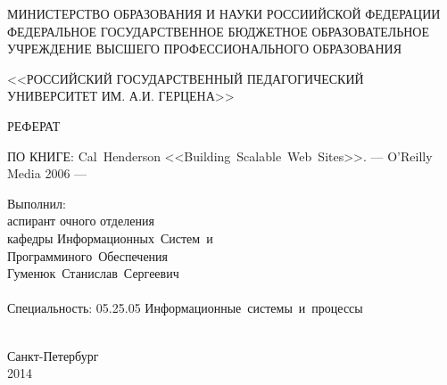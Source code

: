 \thispagestyle{empty}

\begin{center}
МИНИСТЕРСТВО ОБРАЗОВАНИЯ И НАУКИ РОССИИЙСКОЙ ФЕДЕРАЦИИ\\
ФЕДЕРАЛЬНОЕ ГОСУДАРСТВЕННОЕ БЮДЖЕТНОЕ ОБРАЗОВАТЕЛЬНОЕ\\
УЧРЕЖДЕНИЕ ВЫСШЕГО ПРОФЕССИОНАЛЬНОГО ОБРАЗОВАНИЯ\par 

<<РОССИЙСКИЙ ГОСУДАРСТВЕННЫЙ ПЕДАГОГИЧЕСКИЙ\\
УНИВЕРСИТЕТ ИМ. А.И. ГЕРЦЕНА>>
\par
\end{center}



\vspace{50mm}

\begin{center}
РЕФЕРАТ 

ПО КНИГЕ: Cal~Henderson <<Building~Scalable~{Web}~Sites>>. --- O'Reilly Media 2006 ---



\end{center}

\vspace{20mm}
\begin{flushright}
\begin{minipage}
{0.4\textwidth} 
Выполнил:\\
аспирант очного отделения\\
кафедры Информационных~Систем~и\\Программиного~Обеспечения\\
Гуменюк~Станислав~Сергеевич\\ 
\\
Специальность: 05.25.05 Информационные~системы~и~процессы\\
\\[0.3cm] 
\end{minipage}

\end{flushright}

\vfill
\begin{center}
{Санкт-Петербург \\ 2014}
\end{center}

\newpage
